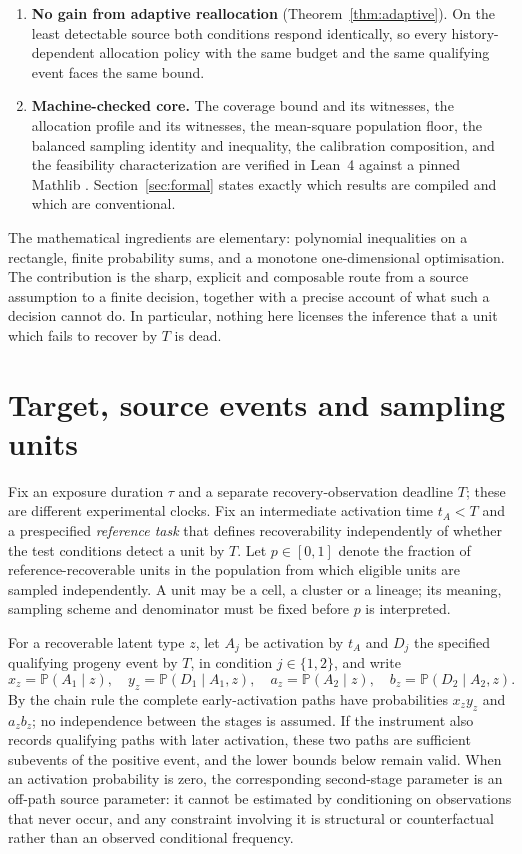 \documentclass[11pt]{article}
\theoremstyle{definition}
\theoremstyle{remark}
\newcommand{\Prob}{\mathbb{P}}
\begin{document}
\begin{enumerate}
\item \textbf{No gain from adaptive reallocation} (Theorem~\ref{thm:adaptive}).
On the least detectable source both conditions respond identically, so every
history-dependent allocation policy with the same budget and the same qualifying
event faces the same bound.
\item \textbf{Machine-checked core.} The coverage bound and its witnesses, the
allocation profile and its witnesses, the mean-square population floor, the
balanced sampling identity and inequality, the calibration composition, and the
feasibility characterization are verified in Lean~4 \citep{moura2021} against a
pinned Mathlib \citep{mathlib2020}. Section~\ref{sec:formal} states exactly which
results are compiled and which are conventional.
\end{enumerate}

The mathematical ingredients are elementary: polynomial inequalities on a
rectangle, finite probability sums, and a monotone one-dimensional optimisation.
The contribution is the sharp, explicit and composable route from a source
assumption to a finite decision, together with a precise account of what such a
decision cannot do. In particular, nothing here licenses the inference that a
unit which fails to recover by $T$ is dead.

\section{Target, source events and sampling units}\label{sec:model}

Fix an exposure duration $\tau$ and a separate recovery-observation deadline
$T$; these are different experimental clocks. Fix an intermediate activation
time $t_A<T$ and a prespecified \emph{reference task} that defines
recoverability independently of whether the test conditions detect a unit by
$T$. Let $p\in[0,1]$ denote the fraction of reference-recoverable units in the
population from which eligible units are sampled independently. A unit may be a
cell, a cluster or a lineage; its meaning, sampling scheme and denominator must
be fixed before $p$ is interpreted.

For a recoverable latent type $z$, let $A_j$ be activation by $t_A$ and $D_j$ the
specified qualifying progeny event by $T$, in condition $j\in\{1,2\}$, and write
\begin{equation}\label{eq:stages}
x_z=\Prob(A_1\mid z),\quad y_z=\Prob(D_1\mid A_1,z),\quad
a_z=\Prob(A_2\mid z),\quad b_z=\Prob(D_2\mid A_2,z).
\end{equation}
By the chain rule the complete early-activation paths have probabilities
$x_zy_z$ and $a_zb_z$; no independence between the stages is assumed. If the
instrument also records qualifying paths with later activation, these two paths
are sufficient subevents of the positive event, and the lower bounds below
remain valid. When an activation probability is zero, the corresponding
second-stage parameter is an off-path source parameter: it cannot be estimated by
conditioning on observations that never occur, and any constraint involving it
is structural or counterfactual rather than an observed conditional frequency.
\end{document}
